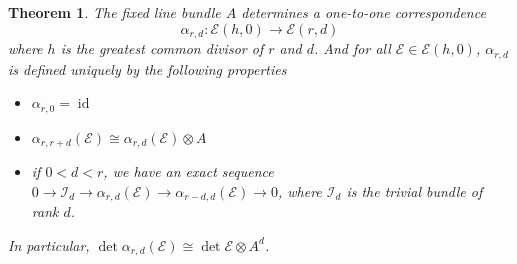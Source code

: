 \documentclass{ctexart}
\newtheorem{theorem}{Theorem}[section]
\newcommand{\identity}{\operatorname{id}}
\begin{document}
\begin{theorem}
    The fixed line bundle $A$ determines a one-to-one correspondence 
    \begin{equation}
        \alpha_{r, d}: \mathcal{E}(h, 0) \rightarrow \mathcal{E}(r, d)
    \end{equation}
    where $h$ is the greatest common divisor of $r$ and $d$.
    And for all $\mathcal{E}\in \mathcal{E}(h, 0)$, $\alpha_{r, d}$ is defined uniquely by the following properties
    \begin{itemize}
        \item $\alpha_{r, 0} = \identity$
        \item $\alpha_{r, r + d}(\mathcal{E}) \cong \alpha_{r, d}(\mathcal{E}) \otimes A$
        \item if $0 < d < r$, we have an exact sequence $0 \rightarrow \mathcal{I}_{d} \longrightarrow \alpha_{r, d}(\mathcal{E}) \longrightarrow \alpha_{r - d, d}(\mathcal{E}) \longrightarrow 0$,
        where $\mathcal{I}_{d}$ is the trivial bundle of rank $d$.
    \end{itemize}
    In particular, $\det \alpha_{r, d}(\mathcal{E}) \cong \det \mathcal{E} \otimes A^{d}$.
    \label{Theorem 5.3}
\end{theorem}
\end{document}
